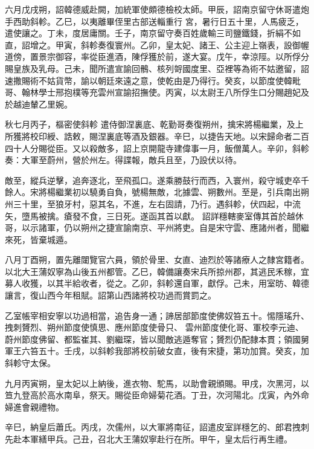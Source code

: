 \begin{pinyinscope}
 六月戊戌朔，詔韓德威赴闕，加統軍使頗德檢校太師。甲辰，詔南京留守休哥遣炮手西助斜軫。乙巳，以夷離畢侄里古部送輜重行
 宮，暑行日五十里，人馬疲乏，遣使讓之。丁未，度居庸關。壬子，南京留守奏百姓歲輸三司鹽鐵錢，折絹不如直，詔增之。甲寅，斜軫奏復寰州。乙卯，皇太妃、諸王、公主迎上嶺表，設御幄道傍，置景宗御容，率從臣進酒，陳俘獲於前，遂大宴。戊午，幸涼陘。以所俘分賜皇族及乳母。己未，聞所遣宣諭回鶻、核列哿國度里、亞裡等為術不姑邀留，詔速撒賜術不姑貨幣，諭以朝廷來遠之意，使乾由是乃得行。癸亥，以節度使韓毗哥、翰林學士邢抱樸等充雲州宣諭招撫使。丙寅，以太尉王八所俘生口分賜趙妃及於越迪輦乙里婉。



 秋七月丙子，樞密使斜軫
 遣侍御涅裏底、乾勤哥奏復朔州，擒宋將楊繼業，及上所獲將校印綬、誥敕，賜涅裏底等酒及銀器。辛巳，以捷告天地。以宋歸命者二百四十人分賜從臣。又以殺敵多，詔上京開龍寺建偉事一月，飯僧萬人。辛卯，斜軫奏：大軍至蔚州，營於州左。得諜報，敵兵且至，乃設伏以待。



 敵至，縱兵逆擊，追奔逐北，至飛孤口。遂乘勝鼓行而西，入寰州，殺守城吏卒千餘人。宋將楊繼業初以驍勇自負，號楊無敵，北據雲、朔數州。至是，引兵南出朔州三十里，至狼牙村，惡其名，不進，左右固請，乃行。遇斜軫，伏四起，中流矢，墮馬被擒。瘡發不食，三日死。遂函其首以獻。
 詔詳穩轄麥室傳其首於越休哥，以示諸軍，仍以朔州之捷宣諭南京、平州將吏。自是宋守雲、應諸州者，聞繼來死，皆棄城遁。



 八月丁酉朔，置先離闥覽官六員，領於骨里、女直、迪烈於等諸療人之隸宮籍者。以北大王蒲奴寧為山後五州都管。乙巳，韓備讓奏宋兵所掠州郡，其逃民禾稼，宜募人收獲，以其半給收者，從之。乙卯，斜軫還自軍，獻俘。己未，用室昉、韓德讓言，復山西今年租賦。詔第山西諸將校功過而賞罰之。



 乙室帳宰相安寧以功過相當，追告身一通；諦居部節度使佛奴笞五十。惕隱瑤升、拽刺贇烈、朔州節度使慎思、應州節度使骨只、
 雲州節度使化哥、軍校李元迪、蔚州節度佛留、都監崔其、劉繼琛，皆以聞敵逃遁奪官；贇烈仍配隸本貫；領國舅軍王六笞五十。壬戌，以斜軫我部將校前破女直，後有宋捷，第功加賞。癸亥，加斜軫守太保。



 九月丙寅朔，皇太妃以上納後，進衣物、駝馬，以助會親頒賜。甲戌，次黑河，以笪九登高於高水南阜，祭天。賜從臣命婦菊花酒。丁丑，次河陽北。戊寅，內外命婦進會親禮物。



 辛巳，納皇后蕭氏。丙戌，次儒州，以大軍將南征，詔遣皮室詳穩乞的、郎君拽刺先赴本軍繕甲兵。己丑，召北大王蒲奴寧赴行在所。甲午，皇太后行再生禮。




\end{pinyinscope}

